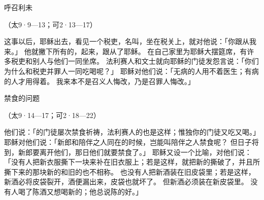 {\par }{\SH 呼召利未
\par }{\R （太9·9—13；可2·13—17）
\par }{\PP {}这事以后，耶稣出去，看见一个税吏，名叫{}，坐在税关上，就对他说：「你跟从我来。」
他就撇下所有的，起来，跟从了耶稣。
在自己家里为耶稣大摆筵席，有许多税吏和别人与他们一同坐席。
法利赛人和文士就向耶稣的门徒发怨言说：「你们为什么和税吏并罪人一同吃喝呢？」
耶稣对他们说：「无病的人用不着医生；有病的人才用得着。
我来本不是召义人悔改，乃是召罪人悔改。」
\par }{\SH 禁食的问题
\par }{\R （太9·14—17；可2·18—22）
\par }{\PP {}他们说：「{}的门徒屡次禁食祈祷，法利赛人的{}也是这样；惟独你的门徒又吃又喝。」
耶稣对他们说：「新郎和陪伴之人同在的时候，岂能叫陪伴之人禁食呢？
但日子将到，新郎要离开他们，那日他们就要禁食了。」
耶稣又设一个比喻，对他们说：「没有人把新衣服撕下一块来补在旧衣服上；若是这样，就把新的撕破了，并且所撕下来的那块新的和旧的也不相称。
也没有人把新酒装在旧皮袋里；若是这样，新酒必将皮袋裂开，酒便漏出来，皮袋也就坏了。
但新酒必须装在新皮袋里。
没有人喝了陈酒又想喝新的；他总说陈的好。」

}
